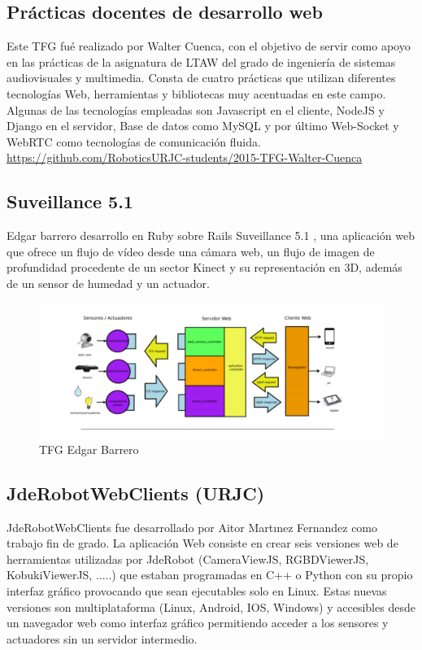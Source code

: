 \subsection*{Prácticas docentes de desarrollo web}
Este TFG\cite{TFGPracticasDesarrolloWeb}\cite{PracticasDesarrolloWeb} fué realizado por Walter Cuenca, con el objetivo de servir como apoyo en las prácticas de la asignatura de LTAW del grado de ingeniería de sistemas audiovisuales y multimedia. Consta de cuatro prácticas que utilizan diferentes tecnologías Web, herramientas y bibliotecas muy acentuadas en este campo. Algunas de las tecnologías empleadas son Javascript en el cliente, NodeJS y Django en el servidor, Base de datos como MySQL y por último Web-Socket y WebRTC como tecnologías de comunicación fluida.
\url{https://github.com/RoboticsURJC-students/2015-TFG-Walter-Cuenca}

\subsection*{Suveillance 5.1}
Edgar barrero desarrollo en Ruby sobre Rails Suveillance 5.1 \cite{TFGsurveillance5.1}\cite{surveillance5.1}, una aplicación web que ofrece un flujo de vídeo desde una cámara web, un flujo de imagen de profundidad procedente de un sector Kinect y su representación en 3D, además de un sensor de humedad y un actuador.


\begin{figure}[!h]
    \centering
    \includegraphics[width=150mm]{img/introduccion/edgar.png}
    \caption{TFG Edgar Barrero}
\end{figure}

\subsection*{JdeRobotWebClients (URJC)}
JdeRobotWebClients \cite{TFGJdeRobotWebClients}\cite{JdeRobotWebClients}fue desarrollado por Aitor Martınez Fernandez como trabajo fin de grado. La aplicación Web consiste en crear seis versiones web de herramientas utilizadas por JdeRobot (CameraViewJS, RGBDViewerJS, KobukiViewerJS, .....) que estaban programadas en C++ o Python con su propio interfaz gráfico provocando que sean ejecutables solo en Linux.
Estas nuevas versiones son multiplataforma (Linux, Android, IOS, Windows) y accesibles desde un navegador web como interfaz gráfico permitiendo acceder a los sensores y actuadores sin un servidor intermedio.

